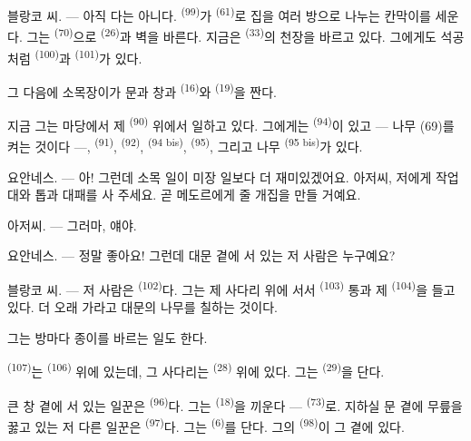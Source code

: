 \VUsaut{3.0mm}
\VUsaut{3.0mm}

\textsc{블랑코} 씨. --- 아직 다는 아니다.  \textsuperscript{(99)}가
 \textsuperscript{(61)}로 집을 여러 방으로 나누는 칸막이를 세운다. 그는
 \textsuperscript{(70)}으로  \textsuperscript{(26)}과 벽을
바른다. 지금은  \textsuperscript{(33)}의 천장을 바르고 있다. 그에게도
석공처럼  \textsuperscript{(100)}과  \textsuperscript{(101)}가
있다.

그 다음에 소목장이가 문과 창과  \textsuperscript{(16)}와 
\textsuperscript{(19)}을 짠다.

지금 그는 마당에서 제  \textsuperscript{(90)} 위에서 일하고 있다.
그에게는  \textsuperscript{(94)}이 있고 — 나무 (69)를 켜는 것이다 —,
 \textsuperscript{(91)},  \textsuperscript{(92)}, 
\textsuperscript{(94 bis)},  \textsuperscript{(95)}, 그리고 나무
 \textsuperscript{(95 bis)}가 있다.

\textsc{요안네스}. --- 아! 그런데 소목 일이 미장 일보다 더 재미있겠어요. 아저씨, 저에게
작업대와 톱과 대패를 사 주세요. 곧 메도르에게 줄 개집을 만들 거예요.

\textsc{아저씨}. --- 그러마, 얘야.

\textsc{요안네스}. --- 정말 좋아요! 그런데 대문 곁에 서 있는 저 사람은 누구예요?

\VUsaut{3.0mm}
\VUsaut{3.0mm}

\textsc{블랑코} 씨. --- 저 사람은  \textsuperscript{(102)}다. 그는 제
사다리 위에 서서  \textsuperscript{(103)} 통과 제 
\textsuperscript{(104)}을 들고 있다. 더 오래 가라고 대문의 나무를 칠하는 것이다.

그는 방마다 종이를 바르는 일도 한다.

 \textsuperscript{(107)}는  \textsuperscript{(106)} 위에
있는데, 그 사다리는  \textsuperscript{(28)} 위에 있다. 그는 
\textsuperscript{(29)}을 단다.

큰 창 곁에 서 있는 일꾼은  \textsuperscript{(96)}다. 그는
 \textsuperscript{(18)}을 끼운다 —  \textsuperscript{(73)}로.
지하실 문 곁에 무릎을 꿇고 있는 저 다른 일꾼은 
\textsuperscript{(97)}다. 그는  \textsuperscript{(6)}를 단다. 그의
 \textsuperscript{(98)}이 그 곁에 있다.

